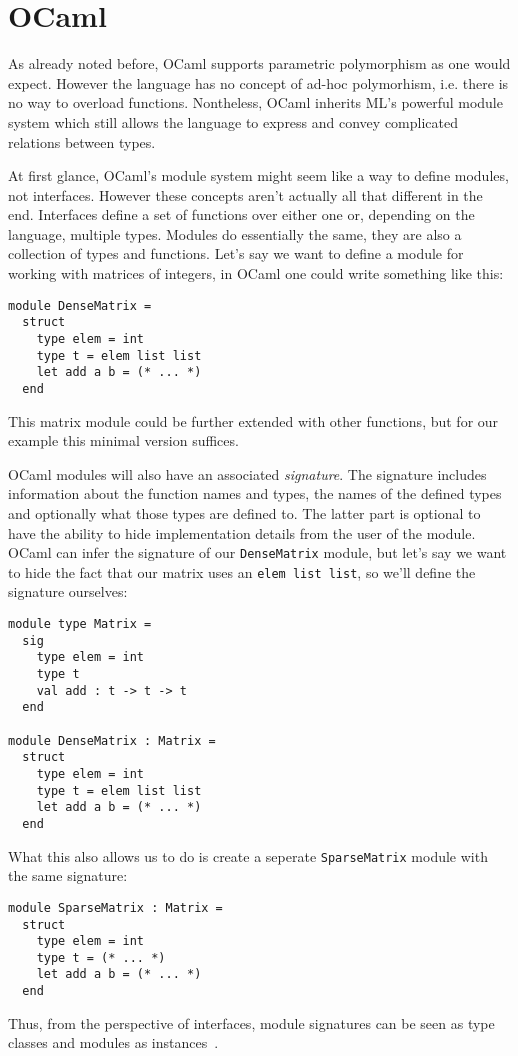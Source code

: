 \section{OCaml}

As already noted before, OCaml supports parametric polymorphism as one would expect. However the language has no concept of ad-hoc polymorhism, i.e. there is no way to overload functions. Nontheless, OCaml inherits ML's powerful module system which still allows the language to express and convey complicated relations between types.

At first glance, OCaml's module system might seem like a way to define modules, not interfaces. However these concepts aren't actually all that different in the end. Interfaces define a set of functions over either one or, depending on the language, multiple types. Modules do essentially the same, they are also a collection of types and functions. Let's say we want to define a module for working with matrices of integers, in OCaml one could write something like this:
\begin{verbatim}
module DenseMatrix =
  struct
    type elem = int
    type t = elem list list
    let add a b = (* ... *)
  end
\end{verbatim}
This matrix module could be further extended with other functions, but for our example this minimal version suffices.

OCaml modules will also have an associated \textit{signature}. The signature includes information about the function names and types, the names of the defined types and optionally what those types are defined to. The latter part is optional to have the ability to hide implementation details from the user of the module. OCaml can infer the signature of our \verb|DenseMatrix| module, but let's say we want to hide the fact that our matrix uses an \verb|elem list list|, so we'll define the signature ourselves:
\begin{verbatim}
module type Matrix =
  sig
    type elem = int
    type t
    val add : t -> t -> t
  end

module DenseMatrix : Matrix =
  struct
    type elem = int
    type t = elem list list
    let add a b = (* ... *)
  end
\end{verbatim}
What this also allows us to do is create a seperate \verb|SparseMatrix| module with the same signature:
\begin{verbatim}
module SparseMatrix : Matrix =
  struct
    type elem = int
    type t = (* ... *)
    let add a b = (* ... *)
  end
\end{verbatim}
Thus, from the perspective of interfaces, module signatures can be seen as type classes and modules as instances~\cite{modular-type-classes}.


